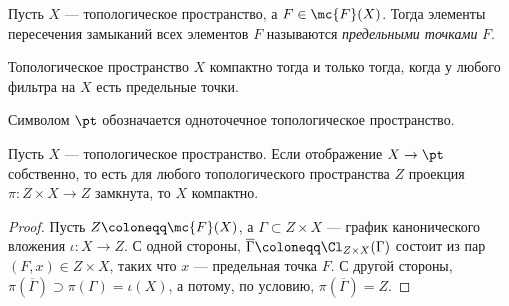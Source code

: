 \documentclass[
	extrafontsizes,
	11pt,
	hyphens,
]{memoir}
\begin{document}
\begin{definition}
Пусть \(X\) --- топологическое пространство,
а \(F \in \mc{F}(X)\).
Тогда элементы пересечения замыканий всех элементов \(F\) называются \emph{предельными точками} \(F\).
\end{definition}

\begin{observation}
Топологическое пространство \(X\) компактно тогда и только тогда, когда у любого фильтра на \(X\) есть предельные точки.
\end{observation}


\begin{notation}
Символом \(\pt\) обозначается одноточечное топологическое пространство.
\end{notation}

\begin{theorem}
\label{thm:comp_proj}
Пусть \(X\) --- топологическое пространство.
Если отображение \(X \to \pt\) собственно,
то есть для любого топологического пространства \(Z\) проекция \(\pi: Z \times X \to Z\) замкнута,
то \(X\) компактно.
\end{theorem}


\begin{proof}
Пусть \(Z \coloneqq \mc{F}(X)\), а \(\Gamma \subset Z \times X\) --- график канонического вложения \(\iota : X \to Z\).
С одной стороны, \(\overline{\Gamma} \coloneqq \Cl_{Z \times X}(\Gamma)\) состоит из пар \((F,x) \in Z \times X\), таких что \(x\) --- предельная точка \(F\).
С другой стороны, \(\pi(\overline{\Gamma}) \supset \pi(\Gamma) = \iota(X)\), а потому, по условию, \(\pi(\overline{\Gamma}) = Z\).
\end{proof}
\end{document}
